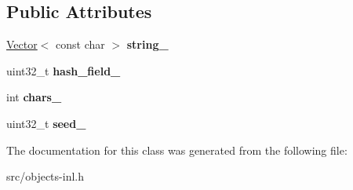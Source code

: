 \subsection*{Public Attributes}
\begin{DoxyCompactItemize}
\item 
\hypertarget{classv8_1_1internal_1_1_utf8_string_key_ac0c854f6c0d7a5b5d367bb1f85d5a039}{}\hyperlink{classv8_1_1internal_1_1_vector}{Vector}$<$ const char $>$ {\bfseries string\+\_\+}\label{classv8_1_1internal_1_1_utf8_string_key_ac0c854f6c0d7a5b5d367bb1f85d5a039}

\item 
\hypertarget{classv8_1_1internal_1_1_utf8_string_key_aa574d16e9bdae63235d2586369dcd174}{}uint32\+\_\+t {\bfseries hash\+\_\+field\+\_\+}\label{classv8_1_1internal_1_1_utf8_string_key_aa574d16e9bdae63235d2586369dcd174}

\item 
\hypertarget{classv8_1_1internal_1_1_utf8_string_key_a14a27629e8ed4eeed5fc67fdfcbdd4ce}{}int {\bfseries chars\+\_\+}\label{classv8_1_1internal_1_1_utf8_string_key_a14a27629e8ed4eeed5fc67fdfcbdd4ce}

\item 
\hypertarget{classv8_1_1internal_1_1_utf8_string_key_a5f7a2097fd04d9ec7afe065d74005275}{}uint32\+\_\+t {\bfseries seed\+\_\+}\label{classv8_1_1internal_1_1_utf8_string_key_a5f7a2097fd04d9ec7afe065d74005275}

\end{DoxyCompactItemize}


The documentation for this class was generated from the following file\+:\begin{DoxyCompactItemize}
\item 
src/objects-\/inl.\+h\end{DoxyCompactItemize}

